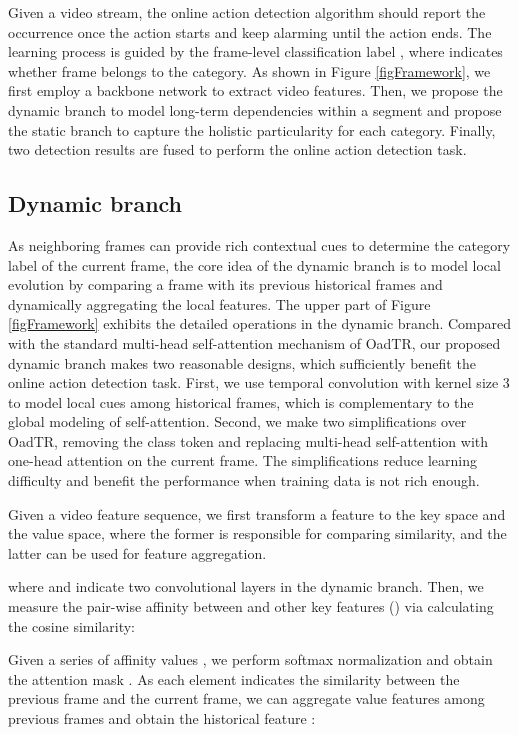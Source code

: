 \documentclass[10pt,twocolumn,letterpaper]{article}
\begin{document}
Given a video stream, the online action detection algorithm should report the occurrence once the action starts and keep alarming until the action ends. The learning process is guided by the frame-level classification label , where  indicates whether frame  belongs to the  category. As shown in Figure \ref{figFramework}, we first employ a backbone network to extract video features. Then, we propose the dynamic branch to model long-term dependencies within a segment and propose the static branch to capture the holistic particularity for each category. Finally, two detection results are fused to perform the online action detection task.

\subsection{Dynamic branch}

As neighboring frames can provide rich contextual cues to determine the category label of the current frame, the core idea of the dynamic branch is to model local evolution by comparing a frame with its previous historical frames and dynamically aggregating the local features. The upper part of Figure \ref{figFramework} exhibits the detailed operations in the dynamic branch. Compared with the standard multi-head self-attention mechanism of OadTR\cite{wang2021oadtr}, our proposed dynamic branch makes two reasonable designs, which sufficiently benefit the online action detection task. First, we use temporal convolution with kernel size 3 to model local cues among historical frames, which is complementary to the global modeling of self-attention. Second, we make two simplifications over OadTR, \ie removing the class token and replacing multi-head self-attention with one-head attention on the current frame. The simplifications reduce learning difficulty and benefit the performance when training data is not rich enough.

Given a video feature sequence, we first transform a feature  to the key space and the value space, where the former is responsible for comparing similarity, and the latter can be used for feature aggregation.

where  and  indicate two convolutional layers in the dynamic branch. Then, we measure the pair-wise affinity between  and other key features (\eg ) via calculating the cosine similarity:



Given a series of affinity values , we perform softmax normalization and obtain the attention mask . As each element  indicates the similarity between the previous  frame and the current frame, we can aggregate value features among previous frames and obtain the historical feature :
\end{document}
